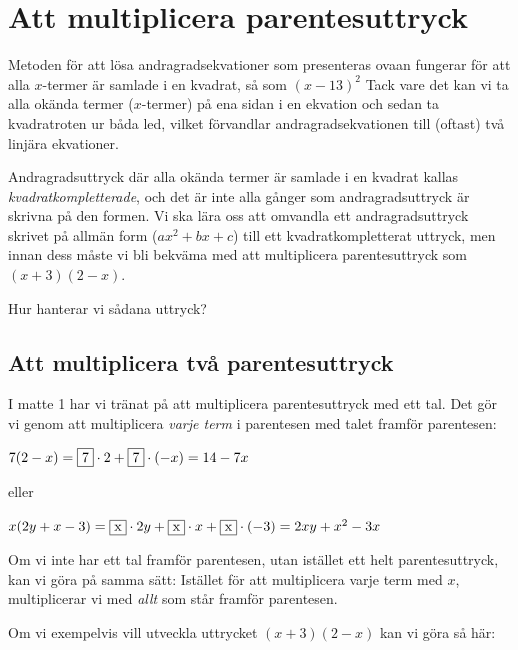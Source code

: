 \section{Att multiplicera parentesuttryck}

Metoden för att lösa andragradsekvationer som presenteras ovaan fungerar för att alla $x$-termer är samlade i en kvadrat, så som $(x - 13)^2$
Tack vare det kan vi ta alla okända termer ($x$-termer) på ena sidan i en ekvation och sedan ta kvadratroten ur båda led, vilket förvandlar andragradsekvationen till (oftast) två linjära ekvationer.

Andragradsuttryck där alla okända termer är samlade i en kvadrat kallas \emph{kvadratkompletterade}, och det är inte alla gånger som andragradsuttryck är skrivna på den formen.
Vi ska lära oss att omvandla ett andragradsuttryck skrivet på allmän form ($ax^2 + bx + c$) till ett kvadratkompletterat uttryck, men innan dess måste vi bli bekväma med att multiplicera parentesuttryck som $(x+3)(2-x)$.

Hur hanterar vi sådana uttryck?

\subsection{Att multiplicera två parentesuttryck}

I matte 1 har vi tränat på att multiplicera parentesuttryck med ett tal.
Det gör vi genom att multiplicera \emph{varje term} i parentesen med talet framför parentesen:

\begin{center}
$7(2-x) = \framebox{7} \cdot 2 + \framebox{7} \cdot (-x) = 14 - 7x$

eller

$x(2y+x-3) = \framebox{x} \cdot 2y + \framebox{x} \cdot x + \framebox{x} \cdot (-3) = 2xy + x^2 - 3x$
\end{center}

Om vi inte har ett tal framför parentesen, utan istället ett helt parentesuttryck, kan vi göra på samma sätt:
Istället för att multiplicera varje term med $x$, multiplicerar vi med \emph{allt} som står framför parentesen.

Om vi exempelvis vill utveckla uttrycket $(x+3)(2-x)$ kan vi göra så här:

